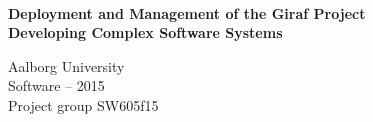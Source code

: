 \thispagestyle{empty}
\begin{center}
\vspace*{\fill}
    \hrulefill\newline\\
    \vspace*{0.35cm}
    {\Large \textbf{Deployment and Management of the Giraf Project}}\\
    \vspace*{0.5cm}
    {\large \textbf{Developing Complex Software Systems}}\\
    \vspace*{0.35cm}
    \hrulefill\newline
    
    Aalborg University\\
    Software -- 2015\\
    Project group SW605f15\\
\end{center}

\vfill

\newpage\null\thispagestyle{empty}\newpage


